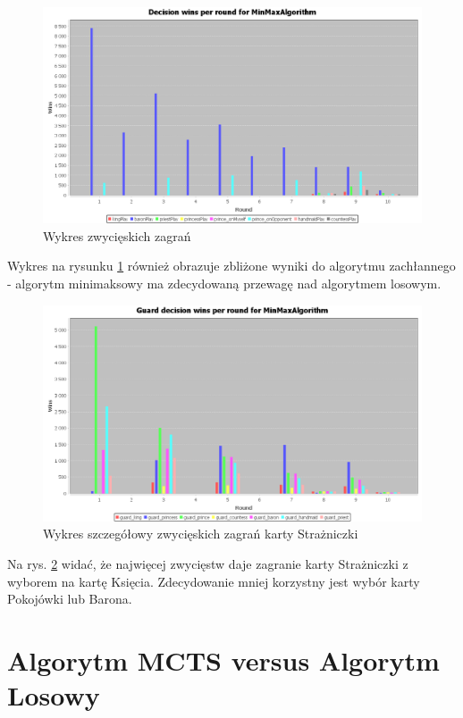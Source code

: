 \begin{figure}[H]
	\centering
	\includegraphics[width=\textwidth]{Resources/MmVsR/MmVsRdecision.PNG}
	\caption{Wykres zwycięskich zagrań} 
	\label{fig:MmVsRdecision}
\end{figure} 

Wykres na rysunku \ref{fig:MmVsRdecision} również obrazuje zbliżone wyniki do algorytmu zachłannego - algorytm minimaksowy ma zdecydowaną przewagę nad algorytmem losowym.

\begin{figure}[H]
	\centering
	\includegraphics[width=\textwidth]{Resources/MmVsR/MmVsRguarddecision.PNG}
	\caption{Wykres szczegółowy zwycięskich zagrań karty Strażniczki} 
	\label{fig:MmVsRguarddecision}
\end{figure}

Na rys. \ref{fig:MmVsRguarddecision} widać, że najwięcej zwycięstw daje zagranie karty Strażniczki z wyborem na kartę Księcia. Zdecydowanie mniej korzystny jest wybór karty Pokojówki lub Barona.

\section{Algorytm MCTS versus Algorytm Losowy}

